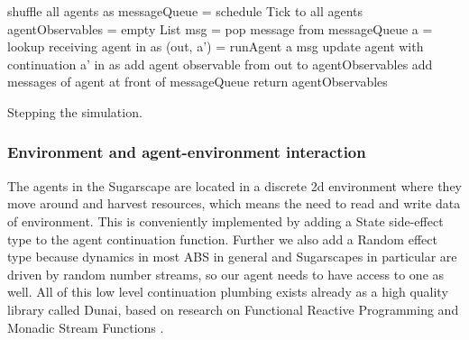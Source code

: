 \begin{algorithm}
shuffle all agents as\;
messageQueue = schedule Tick to all agents\;
agentObservables = empty List\;
 {
  msg = pop message from messageQueue\;
  a = lookup receiving agent in as\;
  (out, a') = runAgent a msg\;
  update agent with continuation a' in as\;
  add agent observable from out to agentObservables\;
  add messages of agent at front of messageQueue\;
}
return agentObservables\;
\caption{Stepping the simulation.}
\end{algorithm}
\label{alg:stepping_simulation}

\subsubsection{Environment and agent-environment interaction}
The agents in the Sugarscape are located in a discrete 2d environment where they move around and harvest resources, which means the need to read and write data of environment. This is conveniently implemented by adding a State side-effect type to the agent continuation function. Further we also add a Random effect type because dynamics in most ABS in general and Sugarscapes in particular are driven by random number streams, so our agent needs to have access to one as well. All of this low level continuation plumbing exists already as a high quality library called Dunai, based on research on Functional Reactive Programming  \cite{hudak_arrows_2003} and Monadic Stream Functions \cite{perez_functional_2016,perez_extensible_2017}.